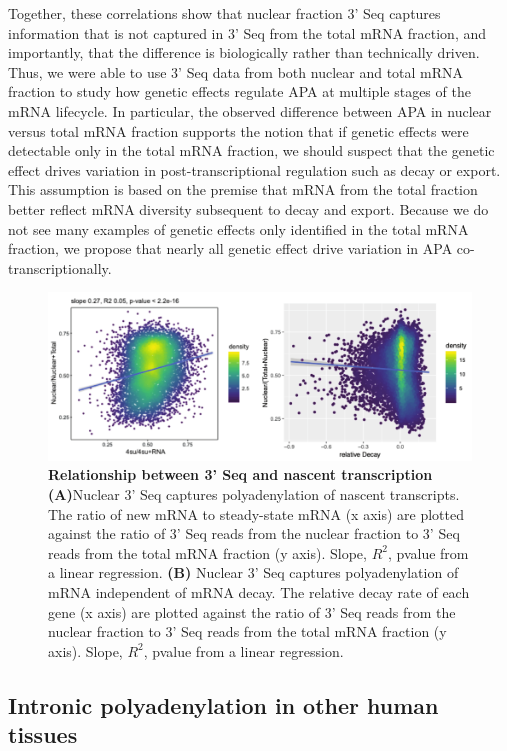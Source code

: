 Together, these correlations show that nuclear fraction 3' Seq captures information that is not captured in 3' Seq from the total mRNA fraction, and importantly, that the difference is biologically rather than technically driven. Thus, we were able to use 3' Seq data from both nuclear and total mRNA fraction to study how genetic effects regulate APA at multiple stages of the mRNA lifecycle.  In particular, the observed difference between APA in nuclear versus total mRNA fraction supports the notion that if genetic effects were detectable only in the total mRNA fraction, we should suspect that the genetic effect drives variation in post-transcriptional regulation such as decay or export. This assumption is based on the premise that mRNA from the total fraction better reflect mRNA diversity subsequent to decay and export. Because we do not see many examples of genetic effects only identified in the total mRNA fraction, we propose that nearly all genetic effect drive variation in APA co-transcriptionally. 

\begin{figure}
\centering \includegraphics[width=5in]{img/ch02/figureAppendix1.pdf}
\caption[Relationship between 3' Seq and nascent transcription]{ \textbf{Relationship between 3' Seq and nascent transcription}  {\bf (A)}Nuclear 3' Seq captures polyadenylation of nascent transcripts. The ratio of new mRNA to steady-state mRNA (x axis) are plotted against the ratio of 3' Seq reads from the nuclear fraction to 3' Seq reads from the total mRNA fraction (y axis). Slope, $R^{2}$, pvalue from a linear regression.  {\bf (B)} Nuclear 3' Seq captures polyadenylation of mRNA independent of mRNA decay. The relative decay rate of each gene (x axis) are plotted against the ratio of 3' Seq reads from the nuclear fraction to 3' Seq reads from the total mRNA fraction (y axis). Slope, $R^{2}$, pvalue from a linear regression.}
\label{fig:Supplementaryfile1-Fig1}
\end{figure}


\subsection{Intronic polyadenylation in other human tissues}\label{ch02-intronic-other-tissues}


